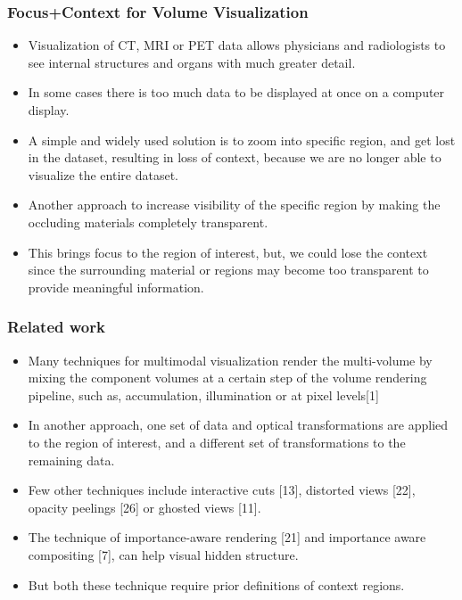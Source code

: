 \documentclass{beamer}
\begin{document}
\begin{frame}
\frametitle{Focus+Context for Volume Visualization}
\begin{itemize}
\item Visualization of CT, MRI or PET data allows physicians and radiologists to see internal structures and organs with much greater detail.
\item In some cases there is too much data to be displayed at once on a computer display.
\item A simple and widely used solution is to zoom into specific region, and get lost in the dataset, resulting in loss of context, because we are no longer able to visualize the entire dataset.
\item Another approach to increase visibility of the specific region by making the occluding materials completely transparent. 
\item This brings focus to the region of interest, but, we could lose the context since the surrounding material or regions may become too transparent to provide meaningful information.
\end{itemize}
\end{frame}



\begin{frame}
\frametitle{Related work}
\begin{itemize}
\item Many techniques for multimodal visualization render the multi-volume by mixing the component volumes at a certain step of the volume rendering pipeline, such as, accumulation, illumination or at pixel levels[1]
\item In another approach, one set of data and optical transformations are applied to the region of interest, and a different set of transformations to the remaining data.
\item Few other techniques include interactive cuts [13], distorted views [22], opacity peelings [26] or ghosted views [11].
\item The technique of importance-aware rendering [21] and importance aware compositing [7], can help visual hidden structure.
\item But both these technique require prior definitions of context regions.
\end{itemize}
\end{frame}


\end{document}
